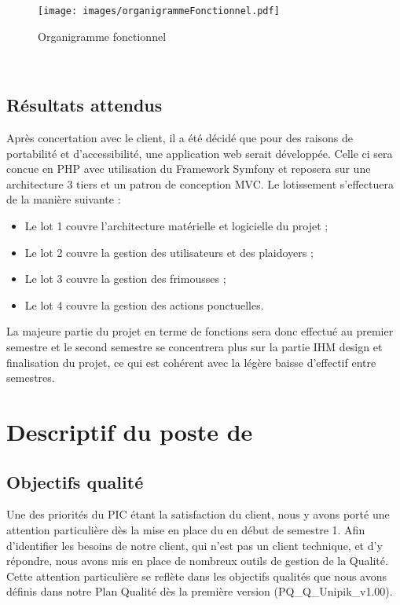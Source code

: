 \documentclass[asi]{picInsa}
\begin{document}
\begin{figure}[H]
	\texttt{[image: images/organigrammeFonctionnel.pdf]}
	\caption{Organigramme fonctionnel}
	\label{organigramme}
\end{figure}
~\\


\section{Résultats attendus}
Après concertation avec le client, il a été décidé que pour des raisons de portabilité et d'accessibilité, une application web serait développée. Celle ci sera concue en PHP avec utilisation du Framework Symfony et reposera sur une architecture 3 tiers et un patron de conception MVC. Le lotissement s’effectuera de la manière suivante :
\begin{itemize}
\item Le lot 1 couvre l'architecture matérielle et logicielle du projet ;
\item Le lot 2 couvre la gestion des utilisateurs et des plaidoyers ;
\item Le lot 3 couvre la gestion des frimousses ;
\item Le lot 4 couvre la gestion des actions ponctuelles.
\end{itemize}

La majeure partie du projet en terme de fonctions sera donc effectué au premier semestre et le second semestre se concentrera plus sur la partie IHM design et finalisation du projet, ce qui est cohérent avec la légère baisse d’effectif entre semestres.

\chapter{Descriptif du poste de \RQ}
\label{Descriptif}
\section{Objectifs qualité}
Une des priorités du PIC étant la satisfaction du client, nous y avons porté une attention particulière dès la mise en place du \SMQ{} en début de semestre 1. Afin d’identifier les besoins de notre client, qui n'est pas un client technique, et d'y répondre, nous avons mis en place de nombreux outils de gestion de la Qualité. Cette attention particulière se reflète dans les objectifs qualités que nous avons définis dans notre Plan Qualité dès la première version (PQ\_Q\_Unipik\_v1.00).
\end{document}
